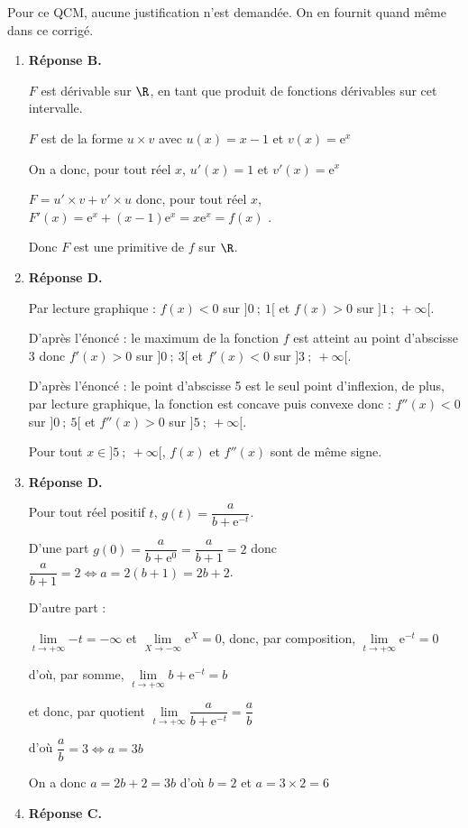 \bigskip
Pour ce QCM, aucune justification n'est demandée. On en fournit quand même dans ce corrigé.
\begin{enumerate}
\item \textbf{Réponse B.}

$F$ est dérivable sur $\R $, en tant que produit de fonctions dérivables sur cet intervalle.

$F$ est de la forme $u \times v$ avec $u(x)=x-1$ et $v(x)=\mathrm{e}^x$

On a donc, pour tout réel $x$,  $u'(x)=1$ et $v'(x)	=\mathrm{e}^x$

$F= u'\times v + v'\times u$ donc,  pour tout réel $x$, $F'(x) = \mathrm{e}^x+ (x-1) \mathrm{e}^x = x\mathrm{e}^x=f(x)$ .

Donc $F$ est une primitive de $f$ sur $\R$.
\item \textbf{Réponse D.}

Par lecture graphique : $f(x)<0$ sur $]0~;~1[$ et $f(x)>0$ sur $]1~;~+\infty[$.

D'après l'énoncé : le maximum de la fonction $f$ est atteint au point d'abscisse 3  donc $f'(x)>0$ sur $]0~;~3[$ et $f'(x) <0$ sur $]3~;~+\infty[$.

D'après l'énoncé : le point d'abscisse 5 est le seul point d'inflexion, de plus,  par lecture  graphique,  la fonction est concave puis convexe donc : $f''(x)<0$ sur $]0~;~5[$ et $f''(x) >0$ sur $]5~;~+\infty[$.



Pour tout $x \in ]5~;~+\infty[$, $f(x)$ et $f''(x)$ sont de même signe.

\item \textbf{Réponse D.}

Pour tout réel positif $t$, $g(t)=\dfrac{a}{b+\mathrm{e}^{-t}}$.

D'une part  $g(0)=\dfrac{a}{b+\mathrm{e}^0}=\dfrac{a}{b+1}=2$ donc $\dfrac{a}{b+1}=2 \iff a=2(b+1)=2b+2$.

D'autre part :

$\lim\limits_{t \to +\infty}{-t}=-\infty$ et $\lim\limits_{X\to -\infty}{\mathrm{e}^X}=0$, donc, par composition, $\lim\limits_{t\to +\infty}{ \mathrm{e}^{-t}}=0$

d'où, par somme, $\lim\limits_{t\to +\infty} b+ \mathrm{e}^{-t}=b$

et donc, par quotient $\lim\limits_{t\to +\infty}\dfrac{a}{b+\mathrm{e}^{-t}}=\dfrac{a}{b}$

d'où $\dfrac{a}{b}=3 \Leftrightarrow a=3b$

On a donc $a=2b+2=3b$ d'où $b=2$ et $a=3\times 2=6$
\item \textbf{Réponse C.}


\end{enumerate}
